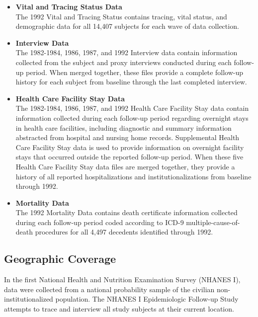 \documentclass[5 pt]{article}
\begin{document}
\begin{itemize}

\item \textbf{Vital and Tracing Status Data}\\
The 1992 Vital and Tracing Status contains tracing, vital status, and demographic data for all 14,407 subjects for each wave of data collection.


\item \textbf{Interview Data}\\
The 1982-1984, 1986, 1987, and 1992 Interview data contain information collected from the subject and proxy interviews conducted during each follow-up period. When merged together, these files provide a complete follow-up history for each subject from baseline through the last completed interview.
\\

\item \textbf{Health Care Facility Stay Data}\\
The 1982-1984, 1986, 1987, and 1992 Health Care Facility Stay data contain information collected during each follow-up period regarding overnight stays in health care facilities, including diagnostic and summary information abstracted from hospital and nursing home records. Supplemental Health Care Facility Stay data is used to provide information on overnight facility stays that occurred outside the reported follow-up period. When these five Health Care Facility Stay data files are merged together, they provide a history of all reported hospitalizations and institutionalizations from baseline through 1992.


\item \textbf{Mortality Data}\\
The 1992 Mortality Data contains death certificate information collected during each follow-up period coded according to ICD-9 multiple-cause-of-death procedures for all 4,497 decedents identified through 1992.

\end{itemize}


\subsection{Geographic Coverage}
In the first National Health and Nutrition Examination Survey (NHANES I), data were collected from a national probability sample of the civilian non-institutionalized population. The NHANES I Epidemiologic Follow-up Study attempts to trace and interview all study subjects at their current location.
\end{document}
